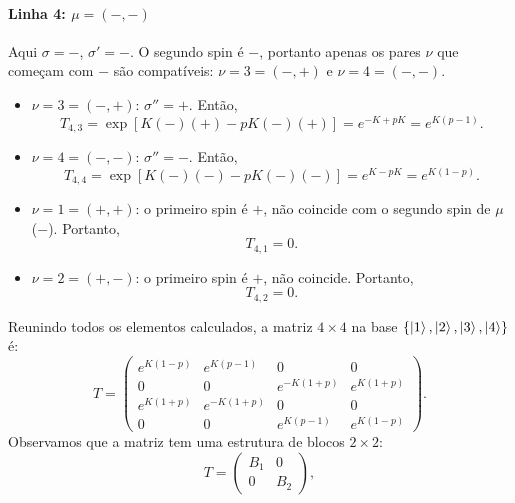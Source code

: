 \documentclass[11pt,a4paper]{article}
\begin{document}
\paragraph{Linha 4: \(\mu = (-,-)\)}
%
Aqui \(\sigma = -\), \(\sigma' = -\). O segundo spin é \(-\), portanto apenas os pares \(\nu\) que começam com \(-\) são compatíveis: \(\nu = 3 = (-,+)\) e \(\nu = 4 = (-,-)\).
%
\begin{itemize}
    \item \(\nu = 3 = (-,+)\): \(\sigma'' = +\). Então,
    \begin{equation}
        T_{4,3} = \exp\left[ K(-)(+) - pK(-)(+) \right] = e^{-K + pK} = e^{K(p-1)}.
    \end{equation}
    
    \item \(\nu = 4 = (-,-)\): \(\sigma'' = -\). Então,
    \begin{equation}
        T_{4,4} = \exp\left[ K(-)(-) - pK(-)(-) \right] = e^{K - pK} = e^{K(1-p)}.
    \end{equation}
    
    \item \(\nu = 1 = (+,+)\): o primeiro spin é \(+\), não coincide com o segundo spin de \(\mu\) (\(-\)). Portanto,
    \begin{equation}
        T_{4,1} = 0.
    \end{equation}
    
    \item \(\nu = 2 = (+,-)\): o primeiro spin é \(+\), não coincide. Portanto,
    \begin{equation}
        T_{4,2} = 0.
    \end{equation}
\end{itemize}
%
Reunindo todos os elementos calculados, a matriz \(4 \times 4\) na base \(\{\ket{1}, \ket{2}, \ket{3}, \ket{4}\}\) é:
%
\begin{equation}
    T =
    \begin{pmatrix}
        e^{K(1-p)} & e^{K(p-1)} & 0 & 0 \\
        0 & 0 & e^{-K(1+p)} & e^{K(1+p)} \\
        e^{K(1+p)} & e^{-K(1+p)} & 0 & 0 \\
        0 & 0 & e^{K(p-1)} & e^{K(1-p)}
    \end{pmatrix}.
    \label{eq:T_annni_completa}
\end{equation}
%
Observamos que a matriz tem uma estrutura de blocos \(2 \times 2\):
%
\begin{equation}
    T =
    \begin{pmatrix}
        B_1 & 0 \\
        0 & B_2
    \end{pmatrix},
\end{equation}
\end{document}
